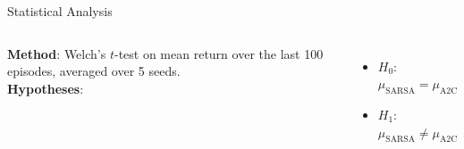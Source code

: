 \documentclass[aspectratio=169, 10pt]{beamer}
\begin{document}
\begin{frame}{Statistical Analysis}
  \begin{columns}[T]
      \textbf{Method}: Welch's $t$-test on mean return over the last
      100 episodes, averaged over 5 seeds.\\[0.4em]

      \textbf{Hypotheses}:
      \begin{itemize}
        \item $H_0$: $\mu_\text{SARSA} = \mu_\text{A2C}$
        \item $H_1$: $\mu_\text{SARSA} \neq \mu_\text{A2C}$
      \end{itemize}
      \vspace{0.4em}


\end{columns}
\end{frame}
\end{document}

